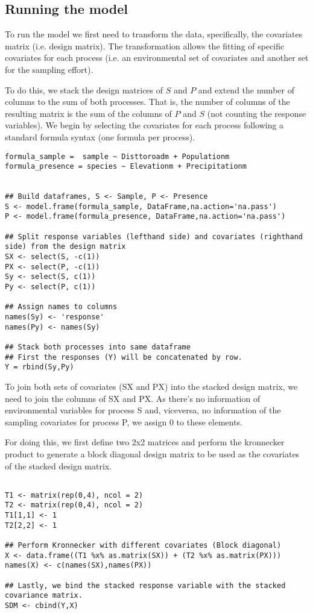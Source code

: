\documentclass[11pt]{article}
\begin{document}
\subsection{Running the model}
\label{sec:orga9ace1b}
To run the model we first need to transform the data, specifically, the covariates matrix (i.e. design matrix). The transformation allows the fitting of specific covariates for each process (i.e. an environmental set of covariates and another set for the sampling effort).

To do this, we stack the design matrices of \(S\) and \(P\) and extend the number of columns to the sum of both processes.
That is, the number of columns of the resulting matrix is the sum of the columns of \(P\) and \(S\) (not counting the response variables). We begin by selecting the covariates for each process following a standard formula syntax (one formula per process).

\begin{verbatim}
formula_sample =  sample ~ Disttoroadm + Populationm
formula_presence = species ~ Elevationm + Precipitationm


## Build dataframes, S <- Sample, P <- Presence
S <- model.frame(formula_sample, DataFrame,na.action='na.pass')
P <- model.frame(formula_presence, DataFrame,na.action='na.pass')

## Split response variables (lefthand side) and covariates (righthand side) from the design matrix
SX <- select(S, -c(1))
PX <- select(P, -c(1))
Sy <- select(S, c(1))
Py <- select(P, c(1))

## Assign names to columns
names(Sy) <- 'response'
names(Py) <- names(Sy)

## Stack both processes into same dataframe
## First the responses (Y) will be concatenated by row.
Y = rbind(Sy,Py)
\end{verbatim}

To join both sets of covariates (SX and PX) into the stacked design matrix, we need to join the columns of SX and PX. As there's no information of environmental variables for process S and, viceversa, no information of the sampling covariates for process P, we assign 0 to these elements.

For doing this, we first define two 2x2 matrices and perform the kronnecker product to generate a block diagonal design matrix to be used as the covariates of the stacked design matrix.

\begin{verbatim}

T1 <- matrix(rep(0,4), ncol = 2)
T2 <- matrix(rep(0,4), ncol = 2)
T1[1,1] <- 1
T2[2,2] <- 1

## Perform Kronnecker with different covariates (Block diagonal)
X <- data.frame((T1 %x% as.matrix(SX)) + (T2 %x% as.matrix(PX)))
names(X) <- c(names(SX),names(PX))

## Lastly, we bind the stacked response variable with the stacked covariance matrix.
SDM <- cbind(Y,X)
\end{verbatim}
\end{document}
